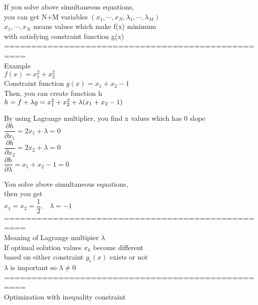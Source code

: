 \documentclass{article}
\begin{document}
If you solve above simultaneous equations, \\ 
you can get N+M variables $(x_1,\cdots,x_N,\lambda_1,\cdots,\lambda_M)$ \\ 

$x_1,\cdots,x_N$ means values which make f(x) minimum \\ 
with satisfying constraint function g(x) \\ 

==================================================\\
Example \\ 
$f(x)=x_1^2+x_2^2$ \\ 
Constraint function $g(x)=x_1+x_2-1$ \\ 

Then, you can create function h \\ 
$h \\\\ 
= f + \lambda g  \\\\ 
= x_1^2 + x_2^2 + \lambda ( x_1 + x_2 - 1 )$


By using Lagrange multiplier, you find x values which has 0 slope \\ 

$\dfrac{\partial h}{\partial x_1} = 2{x_1} + \lambda = 0$ \\
$\dfrac{\partial h}{\partial x_2} = 2{x_2} + \lambda = 0$ \\
$\dfrac{\partial h}{\partial \lambda} = x_1 + x_2 - 1 = 0$ 

You solve above simultaneous equations,\\ 
then you get \\ 
$x_1 = x_2 = \dfrac{1}{2}, \;\;\; \lambda = -1$ \\ 

==================================================\\
Meaning of Lagrange multipier $\lambda$ \\ 

If optimal solution values $x_k$ become different \\ 
based on either constraint $g_i(x)$ exists or not \\ 
$\lambda$ is important so $\lambda \ne 0$ \\ 

==================================================\\
Optimization with inequality constraint \\ 
\end{document}
